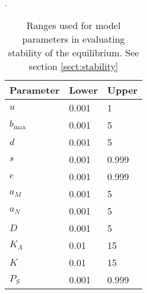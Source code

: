 \documentclass[letterpaper,11pt]{article}
\newcommand{\bmax}{b_{\text{max}}}
\begin{document}
\begin{table}
\begin{center}
\caption{Ranges used for model parameters in evaluating stability of the equilibrium. See section \ref{sect:stability}}.
\label{tab:paramranges}
\begin{tabular}{lll}
\hline
\textbf{Parameter} & \textbf{Lower} & \textbf{Upper} \\
\hline
$u$ & 0.001 & 1 \\
$\bmax$ & 0.001 & 5 \\
$d$ & 0.001 & 5 \\
$s$ & 0.001 & 0.999 \\
$e$ & 0.001 & 0.999 \\
$a_M$ & 0.001 & 5 \\
$a_N$ & 0.001 & 5 \\
$D$ & 0.001 & 5 \\
$K_A$ & 0.01 & 15 \\
$K$ & 0.01 & 15 \\
$P_S$ & 0.001 & 0.999 \\ 
\hline
\end{tabular}
\end{center}
\end{table}
\end{document}
